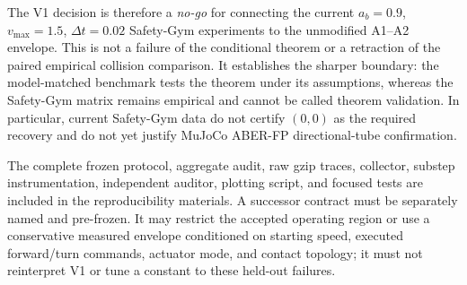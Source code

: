 The V1 decision is therefore a \emph{no-go} for connecting the current
$a_b=0.9$, $v_{\max}=1.5$, $\Delta t=0.02$ Safety-Gym experiments to the
unmodified A1--A2 envelope.  This is not a failure of the conditional theorem
or a retraction of the paired empirical collision comparison.  It establishes
the sharper boundary: the model-matched benchmark tests the theorem under its
assumptions, whereas the Safety-Gym matrix remains empirical and cannot be
called theorem validation.  In particular, current Safety-Gym data do not
certify $(0,0)$ as the required recovery and do not yet justify MuJoCo
ABER-FP directional-tube confirmation.

The complete frozen protocol, aggregate audit, raw gzip traces, collector,
substep instrumentation, independent auditor, plotting script, and focused
tests are included in the reproducibility materials.  A successor contract
must be separately named and pre-frozen.  It may restrict the accepted
operating region or use a conservative measured envelope conditioned on
starting speed, executed forward/turn commands, actuator mode, and contact
topology; it must not reinterpret V1 or tune a constant to these held-out
failures.
